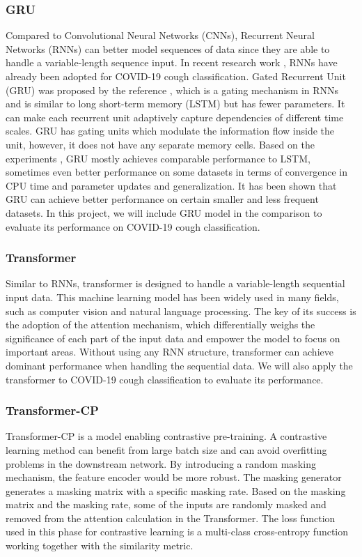 \documentclass[11pt]{article}
\begin{document}
\subsubsection{GRU}
Compared to Convolutional Neural Networks (CNNs), Recurrent Neural Networks (RNNs) can better
model sequences of data since they are able to handle a variable-length sequence input.
In recent research work \cite{Yang1st, Yang2nd}, RNNs have already been adopted for COVID-19 cough classification.
Gated Recurrent Unit (GRU) was proposed by the reference \cite{cho-etal-2014-properties}, which is a gating mechanism in RNNs \cite{Wang2nd} and is similar to long short-term memory (LSTM) \cite{Yang4th} but has fewer parameters. It can make each recurrent unit adaptively capture dependencies of different time scales.
GRU has gating units which
modulate the information flow inside the unit, however, it does not have any separate memory cells.
Based on the experiments \cite{Wang2nd}, GRU mostly achieves comparable performance to LSTM, sometimes
even better performance on some datasets in terms of convergence in CPU time and parameter updates and
generalization. It has been shown that GRU can achieve better
performance on certain smaller and less frequent datasets. 
In this project, we will include
GRU model in the comparison to evaluate its performance on COVID-19 cough classification.


\subsubsection{Transformer}
Similar to RNNs, transformer \cite{Yang5th} is designed to handle a variable-length sequential input data.
This machine learning model has been widely used in many fields, such as computer vision and
natural language processing. The key of its success is the adoption of the attention mechanism,
which differentially weighs the significance of each part of the input data and empower the model
to focus on important areas. Without using any RNN structure, transformer can achieve dominant
performance when handling the sequential data. We will also apply the transformer to COVID-19 cough
classification to evaluate its performance.

\subsubsection{Transformer-CP}
Transformer-CP is a model enabling contrastive pre-training. A contrastive learning method can
benefit from large batch size and can avoid overfitting problems in the downstream network. By
introducing a random masking mechanism, the feature encoder would be more robust. The masking
generator generates a masking matrix with a specific masking rate. Based on the masking matrix
and the masking rate, some of the inputs are randomly masked and removed from the attention calculation
in the Transformer. The loss function used in this phase for contrastive learning is a multi-class
cross-entropy function working together with the similarity metric.\\
\end{document}
